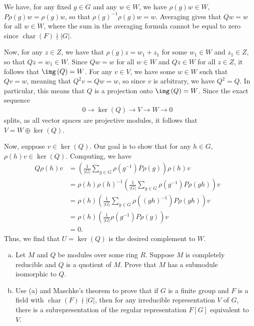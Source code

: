 \documentclass[10pt]{mypackage}
\begin{document}
\begin{solution}
  We have, for any fixed $g\in G$ and any $w\in W$, we have $\rho(g)w\in W$, $P\rho(g)w = \rho(g)w$, so that $\rho\left( g \right)^{-1}\rho(g)w = w$. Averaging gives that $Qw = w$ for all $w\in W$, where the sum in the averaging formula cannot be equal to zero since $\operatorname{char}\left( F \right)\nmid \left\vert G \right\vert$.

  Now, for any $z\in Z$, we have that $\rho(g)z = w_1 + z_1$ for some $w_1\in W$ and $z_1\in Z$, so that $Qz= w_1\in W$. Since $Qw = w$ for all $w\in W$ and $Qz\in W$ for all $z\in Z$, it follows that $\img\left( Q \right) = W$. For any $v\in V$, we have some $w\in W$ such that $Qv = w$, meaning that $Q^2 v = Qw = w$, so since $v$ is arbitrary, we have $Q^2 = Q$. In particular, this means that $Q$ is a projection onto $\img\left( Q \right) = W$. Since the exact sequence
  \begin{align*}
    0 \rightarrow \ker\left( Q \right)\rightarrow V \rightarrow W \rightarrow 0
  \end{align*}
  splits, as all vector spaces are projective modules, it follows that $V = W \oplus \ker\left( Q \right)$.

  Now, suppose $v\in \ker\left( Q \right)$. Our goal is to show that for any $h\in G$, $\rho(h)v\in \ker\left( Q \right)$. Computing, we have
  \begin{align*}
    Q\rho(h)v &= \left( \frac{1}{\left\vert G \right\vert}\sum_{g\in G} \rho\left( g^{-1} \right)P\rho(g) \right)\rho(h)v\\
              &= \rho\left( h \right)\rho\left( h \right)^{-1}\left( \frac{1}{\left\vert G \right\vert}\sum_{g\in G}\rho\left( g^{-1} \right)P\rho(gh) \right)v\\
              &= \rho\left( h \right)\left( \frac{1}{\left\vert G \right\vert}\sum_{g\in G} \rho\left( \left( gh \right)^{-1} \right)P\rho\left( gh \right) \right)v\\
              &= \rho\left( h \right) \left( \frac{1}{\left\vert G \right\vert}\rho\left( g^{-1} \right)P\rho(g) \right)v\\
              &= 0.
  \end{align*}
  Thus, we find that $U = \ker\left( Q \right)$ is the desired complement to $W$.
\end{solution}
\begin{problem}[Problem 4]\hfill
  \begin{enumerate}[(a)]
    \item Let $M$ and $Q$ be modules over some ring $R$. Suppose $M$ is completely reducible and $Q$ is a quotient of $M$. Prove that $M$ has a submodule isomorphic to $Q$.
    \item Use (a) and Maschke's theorem to prove that if $G$ is a finite group and $F$ is a field with $\operatorname{char}\left( F \right)\nmid \left\vert G \right\vert$, then for any irreducible representation $V$ of $G$, there is a subrepresentation of the regular representation $F[G]$ equivalent to $V$.
  \end{enumerate}
\end{problem}
\end{document}
